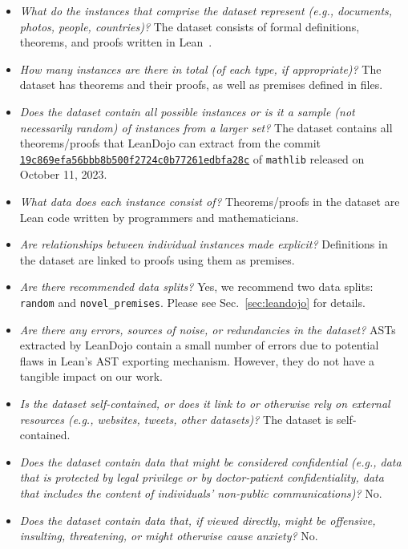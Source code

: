 \begin{itemize}[leftmargin=*]
\item \emph{What do the instances that comprise the dataset represent (e.g., documents, photos, people, countries)?} The dataset consists of formal definitions, theorems, and proofs written in Lean~\cite{de2015lean}.

\item \emph{How many instances are there in total (of each type, if appropriate)?} The dataset has {\numproofs} theorems and their proofs, as well as {\numpremises} premises defined in {\numfiles} files.

\item \emph{Does the dataset contain all possible instances or is it a sample (not necessarily random) of instances from a larger set?} The dataset contains all theorems/proofs that LeanDojo can extract from the commit \href{https://github.com/leanprover-community/mathlib/tree/19c869efa56bbb8b500f2724c0b77261edbfa28c}{\texttt{19c869efa56bbb8b500f2724c0b77261edbfa28c}} of \texttt{mathlib} released on October 11, 2023.

\item \emph{What data does each instance consist of?} Theorems/proofs in the dataset are Lean code written by programmers and mathematicians.

\item \emph{Are relationships between individual instances made explicit?} Definitions in the dataset are linked to proofs using them as premises.

\item \emph{Are there recommended data splits?} Yes, we recommend two data splits: \texttt{random} and \texttt{novel\_premises}. 
Please see Sec.~\ref{sec:leandojo} for details.

\item \emph{Are there any errors, sources of noise, or redundancies in the dataset?} ASTs extracted by LeanDojo contain a small number of errors due to potential flaws in Lean's AST exporting mechanism. However, they do not have a tangible impact on our work.

\item \emph{Is the dataset self-contained, or does it link to or otherwise rely on external resources (e.g., websites, tweets, other datasets)?} The dataset is self-contained.

\item \emph{Does the dataset contain data that might be considered confidential (e.g., data that is protected by legal privilege or by doctor-patient confidentiality, data that includes the content of individuals’ non-public communications)?} No.

\item \emph{Does the dataset contain data that, if viewed directly, might be offensive, insulting, threatening, or might otherwise cause anxiety?} No.

\end{itemize}


